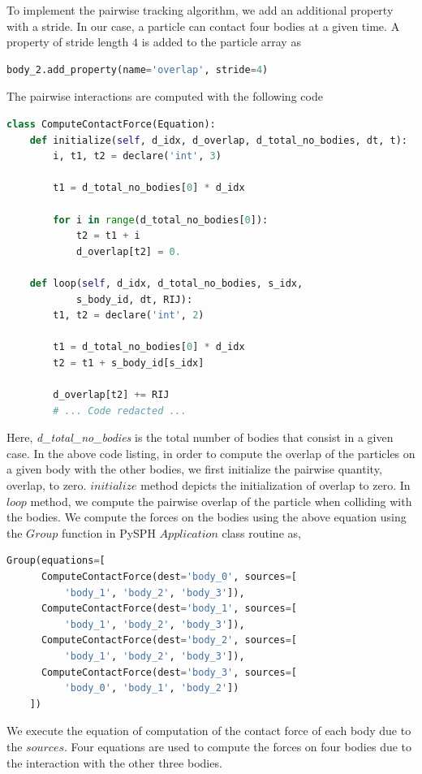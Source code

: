 To implement the pairwise tracking algorithm, we add an additional property with
a stride. In our case, a particle can contact four bodies at a given time. A
property of stride length $4$ is added to the particle array as
 \lstset{basicstyle=\footnotesize\ttfamily}
\begin{lstlisting}[label={contact:equations},frame=lines,language=Python,upquote=True]
body_2.add_property(name='overlap', stride=4)
\end{lstlisting}
The pairwise interactions are computed with the following code
 \lstset{basicstyle=\footnotesize\ttfamily}
\begin{lstlisting}[label={contact:equations},frame=lines,language=Python,upquote=True]
class ComputeContactForce(Equation):
    def initialize(self, d_idx, d_overlap, d_total_no_bodies, dt, t):
        i, t1, t2 = declare('int', 3)

        t1 = d_total_no_bodies[0] * d_idx

        for i in range(d_total_no_bodies[0]):
            t2 = t1 + i
            d_overlap[t2] = 0.

    def loop(self, d_idx, d_total_no_bodies, s_idx,
            s_body_id, dt, RIJ):
        t1, t2 = declare('int', 2)

        t1 = d_total_no_bodies[0] * d_idx
        t2 = t1 + s_body_id[s_idx]

        d_overlap[t2] += RIJ
        # ... Code redacted ...
\end{lstlisting}
Here, \textit{d\_total\_no\_bodies} is the total number of bodies that consist
in a given case. In the above code listing, in order to compute the overlap of
the particles on a given body with the other bodies, we first initialize the
pairwise quantity, overlap, to zero. $initialize$ method depicts the
initialization of overlap to zero. In $loop$ method, we compute the pairwise
overlap of the particle when colliding with the bodies. We compute the forces on
the bodies using the above equation using the $Group$ function in PySPH
$Application$ class routine as,
 \lstset{basicstyle=\footnotesize\ttfamily}
\begin{lstlisting}[label={contact:equations},frame=lines,language=Python,upquote=True]
  Group(equations=[
      ComputeContactForce(dest='body_0', sources=[
          'body_1', 'body_2', 'body_3']),
      ComputeContactForce(dest='body_1', sources=[
          'body_1', 'body_2', 'body_3']),
      ComputeContactForce(dest='body_2', sources=[
          'body_1', 'body_2', 'body_3']),
      ComputeContactForce(dest='body_3', sources=[
          'body_0', 'body_1', 'body_2'])
    ])
\end{lstlisting}
We execute the equation of computation of the contact force of each body due to the
$sources$. Four equations are used to compute the forces on four bodies due to
the interaction with the other three bodies.


